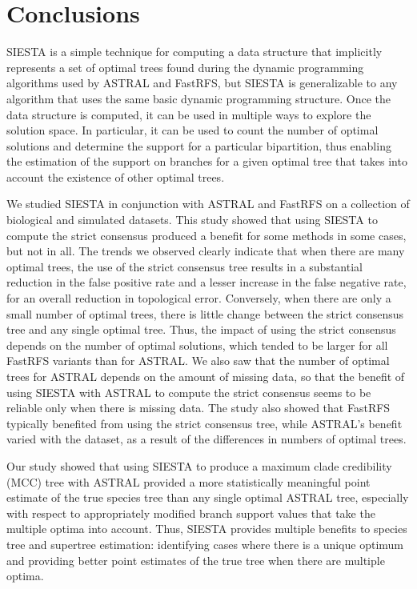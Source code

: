 \section{Conclusions}



SIESTA is a simple technique for computing a data structure that implicitly represents a set of optimal trees found during the dynamic programming algorithms used by ASTRAL and FastRFS, but  SIESTA is generalizable to any algorithm that uses the same basic dynamic programming structure. 
Once the data structure is computed, it can be used in multiple ways to explore the solution space. 
In particular, it can be used to count the number of optimal solutions and determine the support for a particular bipartition, thus enabling the estimation of the support on branches for a given optimal tree that takes into account the existence of  other optimal trees.

We studied SIESTA in conjunction with ASTRAL and FastRFS on a collection of biological and simulated datasets. This study showed that using SIESTA to compute the strict consensus produced a benefit for some methods in some cases, but not in all.
The trends we observed clearly indicate that when there are many optimal trees, the use of the strict consensus tree results in a substantial reduction in the false positive rate and a lesser increase in the false negative rate, for an overall reduction in topological error. 
Conversely, when there are only a small number of optimal trees, there is little change between the strict consensus tree and any single optimal tree.
Thus, the impact of using the strict consensus depends on the number of optimal solutions, which tended to be larger for all FastRFS variants than for ASTRAL.
We also saw that the number of optimal trees for ASTRAL depends on the amount of missing data, so that the benefit of using SIESTA with ASTRAL to compute the strict consensus seems to be reliable only when there is missing data. 
The study also showed that  FastRFS typically benefited from using the strict consensus tree, while ASTRAL's benefit varied with the dataset, as a result of the differences in numbers of optimal trees.


Our study showed that using SIESTA to produce a maximum clade credibility (MCC) tree with ASTRAL provided a  more statistically meaningful point estimate of the true species tree than any single optimal ASTRAL tree, especially with respect to appropriately modified branch support values that take the multiple optima into account.
Thus, SIESTA provides multiple benefits to species tree and supertree estimation: identifying cases where there is a unique optimum and providing better point estimates of the true tree when there are multiple optima.

